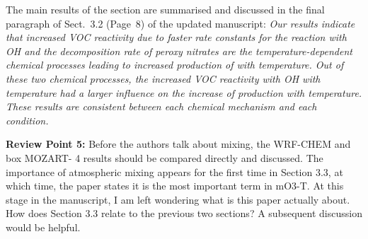 \documentclass{article}
\begin{document}
The main results of the section are summarised and discussed in the final paragraph of Sect.~3.2 (Page~8) of the updated manuscript:
\textit{
Our results indicate that increased VOC reactivity due to faster rate constants for the reaction with OH and the decomposition rate of peroxy nitrates are the temperature-dependent chemical processes leading to increased production of  with temperature.
Out of these two chemical processes, the increased VOC reactivity with OH with temperature had a larger influence on the increase of  production with temperature.
These results are consistent between each chemical mechanism and each  condition.
}

\textbf{Review Point 5:} Before the authors talk about mixing, the WRF-CHEM and box MOZART- 4 results should be compared directly and discussed. The importance of atmospheric mixing appears for the first time in Section 3.3, at which time, the paper states it is the most important term in mO3-T. At this stage in the manuscript, I am left wondering what is this paper actually about. How does Section 3.3 relate to the previous two sections?  A subsequent discussion would be helpful.
\end{document}
